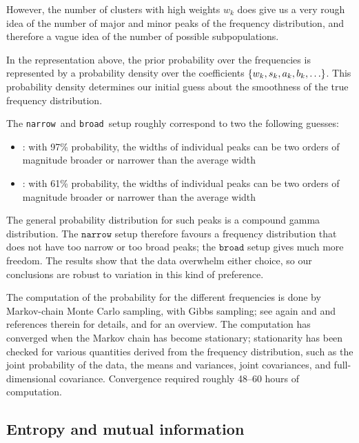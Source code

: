 \documentclass[\ifafour a4paper,12pt,\else a5paper,10pt,\fi%
onecolumn,oneside,article,%
british%
]{memoir}
\theoremstyle{remark}
\theoremstyle{innote}
\DeclarePairedDelimiter\set{\{}{\}} %
\renewcommand*{\|}[1][]{\nonscript\:#1\vert\nonscript\:\mathopen{}}
\newcommand*{\chap}{ch.}%
\newcommand*{\narrow}{\texttt{narrow}}
\newcommand*{\broad}{\texttt{broad}}
\begin{document}
However, the number of clusters with high weights $w_{k}$ does give us a
very rough idea of the number of major and minor peaks of the frequency
distribution, and therefore a vague idea of the number of possible
subpopulations.

In the representation above, the prior probability over the frequencies is
represented by a probability density over the coefficients
$\set{w_{k},s_{k},a_{k},b_{k},\dotsc}$. This probability density determines
our initial guess about the smoothness of the true frequency
distribution.

The \narrow\ and \broad\ setup roughly correspond to two the following
guesses:
\begin{itemize}[wide]
\item[\narrow]\!: with 97\% probability, the widths of individual peaks can
  be two orders of magnitude broader or narrower than the average width
\item[\broad]\!: with 61\% probability, the widths of individual peaks can
  be two orders of magnitude broader or narrower than the average width
\end{itemize}
The general probability distribution for such peaks is a compound gamma
distribution. The $\narrow$ setup therefore favours a frequency
distribution that does not have too narrow or too broad peaks; the $\broad$
setup gives much more freedom. The results show that the data overwhelm
either choice, so our conclusions are robust to variation in this kind of
preference.

\bigskip

The computation of the probability for the different frequencies is done by
Markov-chain Monte Carlo sampling, with Gibbs sampling; see again
\textcite{dunsonetal2011} and \textcite{rasmussen1999} and references
therein for details, and \textcite[\chap~29]{mackay1995_r2005} for an
overview. The computation has converged when the Markov chain has become
stationary; stationarity has been checked for various quantities derived
from the frequency distribution, such as the joint probability of the data,
the means and variances, joint covariances, and full-dimensional
covariance. Convergence required roughly 48--60 hours of computation.



\subsection{Entropy and mutual information}
\label{sec:mutualionfo}
\end{document}
